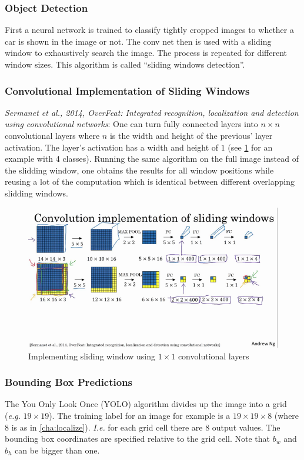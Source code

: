 \documentclass{article}
\begin{document}
\subsubsection{Object Detection}
First a neural network is trained to classify tightly cropped images to whether a car is shown in the image or not.
The conv net then is used with a sliding window to exhaustively search the image.
The process is repeated for different window sizes.
This algorithm is called ``sliding windows detection''.

\subsubsection{Convolutional Implementation of Sliding Windows}\label{cha:cnnslide}
\emph{Sermanet et al., 2014, OverFeat: Integrated recognition, localization and detection using convolutional networks}:
One can turn fully connected layers into $n\times n$ convolutional layers where $n$ is the width and height of the previous' layer activation.
The layer's activation has a width and height of $1$ (see \cref{fig:convslide} for an example with 4 classes).
Running the same algorithm on the full image instead of the slidding window, one obtains the results for all window positions
while reusing a lot of the computation which is identical between different overlapping slidding windows.
\begin{figure}[htbp]
  \begin{center}
    \includegraphics[width=\textwidth]{convslide}
    \caption{Implementing sliding window using $1\times 1$ convolutional layers}
    \label{fig:convslide}
  \end{center}
\end{figure}

\subsubsection{Bounding Box Predictions}\label{cha:bbpred}
The You Only Look Once (YOLO) algorithm divides up the image into a grid (\emph{e.g.} $19\times 19$).
The training label for an image for example is a $19\times 19\times 8$ (where $8$ is as in \cref{cha:localize}).
\emph{I.e.} for each grid cell there are $8$ output values.
The bounding box coordinates are specified relative to the grid cell.
Note that $b_w$ and $b_h$ can be bigger than one.
\end{document}
